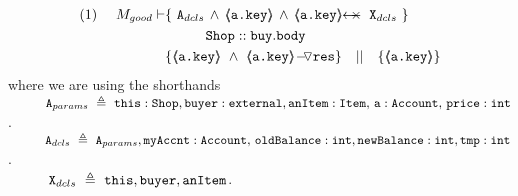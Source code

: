 \newcommand{\Aparams}{\prg{A}_{params}}
\newcommand{\Alocals}{\prg{A}_{dcls}}
\newcommand{\Ids}{\prg{X}_{dcls}}
\newcommand{\stmtsP}{\prg{stmts}_{10,11,12}}
\newcommand{\step}[1]{ \vspace{.1cm} \noindent {\textbf{#1}}}

\begin{lemma}
\label{l:sub:one}
 
\begin{align*}
\text{(1)}  \ \ \ \ M_{good} \vdash 
		&	\{  \ \Alocals\,\wedge\, {\inside{\prg{a.key}}} \, \wedge \, \protectedFrom {\prg{a.key}} {\Ids}  \  \} \\
		& \SPT \prg{Shop}::\prg{buy}.\prg{body}\ \\  
		& \{ {\inside{\prg{a.key}}}\ \wedge\ {\PushASLong {\prg{res}} {\inside{\prg{a.key}}}}  \} \ \ \  || \ \ \ 
		   \{ {\inside{\prg{a.key}}} \}
\end{align*}
where we are using the shorthands\\
 $ \SPT  \Aparams\ \triangleq \  \prg{this}:\prg{Shop}, \prg{buyer} : \prg{external}, \prg{anItem} : \prg{Item},\, \prg{a}:\prg{Account},\, \prg{price} : \prg{int}$.\\
  $ \SPT  \Alocals\ \triangleq \  \Aparams,  \prg{myAccnt} : \prg{Account},\, \prg{oldBalance}:  \prg{int},  \prg{newBalance}:  \prg{int},  \prg{tmp}:  \prg{int}$.\\
   $ \SPT  \Ids\ \triangleq \   \prg{this}, \prg{buyer}, \prg{anItem}$.\\

\end{lemma}

